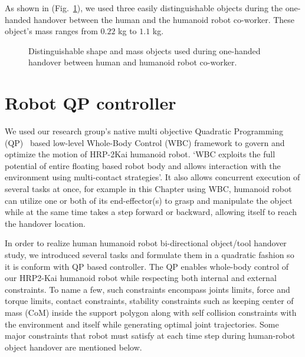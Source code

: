 As shown in (Fig.~\ref{fig:objects}), we used three easily distinguishable objects during the one-handed handover between the human and the humanoid robot co-worker. These object's mass ranges from $0.22$ kg to $1.1$ kg.


\begin{figure}[H]
	\caption{Distinguishable shape and mass objects used during one-handed handover between human and humanoid robot co-worker.}
	\label{fig:objects}
\end{figure}


\section{Robot QP controller}\label{QPController}

We used our research group's native multi objective Quadratic Programming (QP)~\cite{ladder-HRP-2Kai} based low-level Whole-Body Control (WBC) framework to govern and optimize the motion of HRP-2Kai humanoid robot. `WBC exploits the full potential of entire floating based robot body and allows interaction with the environment using multi-contact strategies'. It also allows concurrent execution of several tasks at once, for example in this Chapter using WBC, humanoid robot can utilize one or both of its end-effector(s) to grasp and manipulate the object while at the same time takes a step forward or backward, allowing itself to reach the handover location. 

In order to realize human humanoid robot bi-directional object/tool handover study, we introduced several tasks and formulate them in a quadratic fashion so it is conform with QP based controller. The QP enables whole-body control of our HRP2-Kai humanoid robot while respecting both internal and external constraints. To name a few, such constraints encompass joints limits, force and torque limits, contact constraints, stability constraints such as keeping center of mass (CoM) inside the support polygon along with self collision constraints with the environment and itself while generating optimal joint trajectories. Some major constraints that robot must satisfy at each time step during human-robot object handover are mentioned below.


